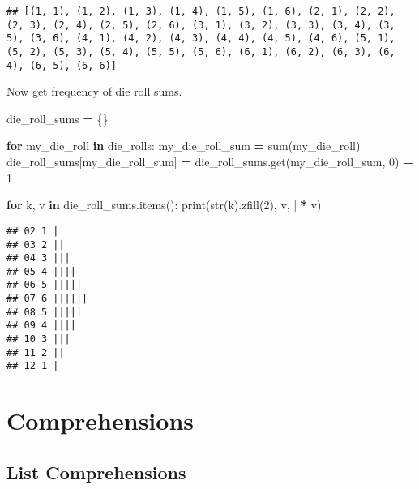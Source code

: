 \documentclass[
]{book}
\newenvironment{Shaded}{\begin{snugshade}}{\end{snugshade}}
\newcommand{\BuiltInTok}[1]{#1}
\newcommand{\ControlFlowTok}[1]{\textcolor[rgb]{0.13,0.29,0.53}{\textbf{#1}}}
\newcommand{\DecValTok}[1]{\textcolor[rgb]{0.00,0.00,0.81}{#1}}
\newcommand{\KeywordTok}[1]{\textcolor[rgb]{0.13,0.29,0.53}{\textbf{#1}}}
\newcommand{\NormalTok}[1]{#1}
\newcommand{\OperatorTok}[1]{\textcolor[rgb]{0.81,0.36,0.00}{\textbf{#1}}}
\newcommand{\StringTok}[1]{\textcolor[rgb]{0.31,0.60,0.02}{#1}}
\begin{document}
\begin{verbatim}
## [(1, 1), (1, 2), (1, 3), (1, 4), (1, 5), (1, 6), (2, 1), (2, 2), (2, 3), (2, 4), (2, 5), (2, 6), (3, 1), (3, 2), (3, 3), (3, 4), (3, 5), (3, 6), (4, 1), (4, 2), (4, 3), (4, 4), (4, 5), (4, 6), (5, 1), (5, 2), (5, 3), (5, 4), (5, 5), (5, 6), (6, 1), (6, 2), (6, 3), (6, 4), (6, 5), (6, 6)]
\end{verbatim}

Now get frequency of die roll sums.

\begin{Shaded}
\begin{Highlighting}[]
\NormalTok{die\_roll\_sums }\OperatorTok{=}\NormalTok{ \{\}}
\end{Highlighting}
\end{Shaded}

\begin{Shaded}
\begin{Highlighting}[]
\ControlFlowTok{for}\NormalTok{ my\_die\_roll }\KeywordTok{in}\NormalTok{ die\_rolls:}
\NormalTok{    my\_die\_roll\_sum }\OperatorTok{=} \BuiltInTok{sum}\NormalTok{(my\_die\_roll)}
\NormalTok{    die\_roll\_sums[my\_die\_roll\_sum] }\OperatorTok{=}\NormalTok{ die\_roll\_sums.get(my\_die\_roll\_sum, }\DecValTok{0}\NormalTok{) }\OperatorTok{+} \DecValTok{1}
\end{Highlighting}
\end{Shaded}

\begin{Shaded}
\begin{Highlighting}[]
\ControlFlowTok{for}\NormalTok{ k, v }\KeywordTok{in}\NormalTok{ die\_roll\_sums.items():}
    \BuiltInTok{print}\NormalTok{(}\BuiltInTok{str}\NormalTok{(k).zfill(}\DecValTok{2}\NormalTok{), v, }\StringTok{\textquotesingle{}|\textquotesingle{}} \OperatorTok{*}\NormalTok{ v)}
\end{Highlighting}
\end{Shaded}

\begin{verbatim}
## 02 1 |
## 03 2 ||
## 04 3 |||
## 05 4 ||||
## 06 5 |||||
## 07 6 ||||||
## 08 5 |||||
## 09 4 ||||
## 10 3 |||
## 11 2 ||
## 12 1 |
\end{verbatim}

\section{Comprehensions}\label{comprehensions}

\subsection{List Comprehensions}\label{list-comprehensions}
\end{document}
